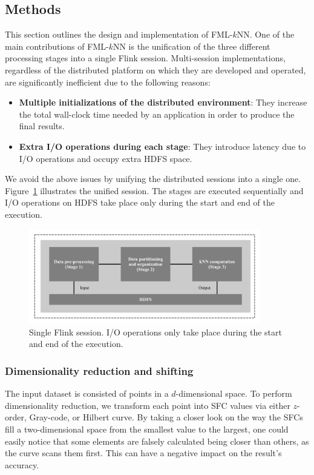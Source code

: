 \subsection{Methods}
\label{sec:sec_alg}
This section outlines the design and implementation of FML-$k$NN. One of the main contributions of FML-$k$NN is the unification of the three different processing stages into a single Flink session. Multi-session implementations, regardless of the distributed platform on which they are developed and operated, are significantly inefficient due to the following reasons:

\begin{itemize}
	\item \textbf{Multiple initializations of the distributed environment}: They increase the total wall-clock time needed by an application in order to produce the final results.
	\item \textbf{Extra I/O operations during each stage}: They introduce latency due to I/O operations and occupy extra HDFS space.
\end{itemize}

We avoid the above issues by unifying the distributed sessions into a single one. Figure~\ref{figure2} illustrates the unified session. The stages are executed sequentially and I/O operations on HDFS take place only during the start and end of the execution.

\begin{figure}[h!]
	\centering
	\includegraphics[width=0.9\textwidth]{figures/figure2.png}
	\caption{Single Flink session. I/O operations only take place during the start and end of the execution.}
	\label{figure2}
\end{figure}

\subsubsection{Dimensionality reduction and shifting}
The input dataset is consisted of points in a $d$-dimensional space. To perform dimensionality reduction, we transform each point into SFC values via either $z$-order, Gray-code, or Hilbert curve. By taking a closer look on the way the SFCs fill a two-dimensional space from the smallest value to the largest, one could easily notice that some elements are falsely calculated being closer than others, as the curve scans them first. This can have a negative impact on the result’s accuracy. 

